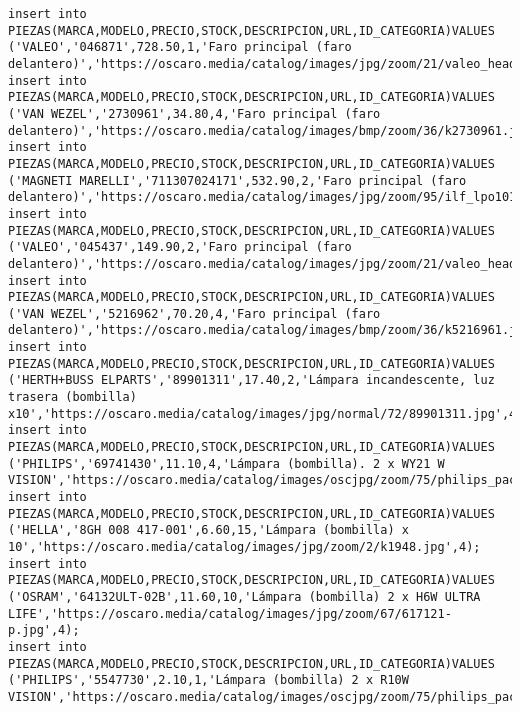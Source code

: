\begin{lstlisting}[caption=Script .sql para crear la BD (BBDD)]
insert into PIEZAS(MARCA,MODELO,PRECIO,STOCK,DESCRIPCION,URL,ID_CATEGORIA)VALUES ('VALEO','046871',728.50,1,'Faro principal (faro delantero)','https://oscaro.media/catalog/images/jpg/zoom/21/valeo_headlamp_046871_01.jpg',4);
insert into PIEZAS(MARCA,MODELO,PRECIO,STOCK,DESCRIPCION,URL,ID_CATEGORIA)VALUES ('VAN WEZEL','2730961',34.80,4,'Faro principal (faro delantero)','https://oscaro.media/catalog/images/bmp/zoom/36/k2730961.jpg',4);
insert into PIEZAS(MARCA,MODELO,PRECIO,STOCK,DESCRIPCION,URL,ID_CATEGORIA)VALUES ('MAGNETI MARELLI','711307024171',532.90,2,'Faro principal (faro delantero)','https://oscaro.media/catalog/images/jpg/zoom/95/ilf_lpo101_wr.jpg',4);
insert into PIEZAS(MARCA,MODELO,PRECIO,STOCK,DESCRIPCION,URL,ID_CATEGORIA)VALUES ('VALEO','045437',149.90,2,'Faro principal (faro delantero)','https://oscaro.media/catalog/images/jpg/zoom/21/valeo_headlamp_045437_01.jpg',4);
insert into PIEZAS(MARCA,MODELO,PRECIO,STOCK,DESCRIPCION,URL,ID_CATEGORIA)VALUES ('VAN WEZEL','5216962',70.20,4,'Faro principal (faro delantero)','https://oscaro.media/catalog/images/bmp/zoom/36/k5216961.jpg',4);
insert into PIEZAS(MARCA,MODELO,PRECIO,STOCK,DESCRIPCION,URL,ID_CATEGORIA)VALUES ('HERTH+BUSS ELPARTS','89901311',17.40,2,'Lámpara incandescente, luz trasera (bombilla) x10','https://oscaro.media/catalog/images/jpg/normal/72/89901311.jpg',4);
insert into PIEZAS(MARCA,MODELO,PRECIO,STOCK,DESCRIPCION,URL,ID_CATEGORIA)VALUES ('PHILIPS','69741430',11.10,4,'Lámpara (bombilla). 2 x WY21 W VISION','https://oscaro.media/catalog/images/oscjpg/zoom/75/philips_pack_pr_wy21w_69741430_12071b2_s_emea_16.jpg',4);
insert into PIEZAS(MARCA,MODELO,PRECIO,STOCK,DESCRIPCION,URL,ID_CATEGORIA)VALUES ('HELLA','8GH 008 417-001',6.60,15,'Lámpara (bombilla) x 10','https://oscaro.media/catalog/images/jpg/zoom/2/k1948.jpg',4);
insert into PIEZAS(MARCA,MODELO,PRECIO,STOCK,DESCRIPCION,URL,ID_CATEGORIA)VALUES ('OSRAM','64132ULT-02B',11.60,10,'Lámpara (bombilla) 2 x H6W ULTRA LIFE','https://oscaro.media/catalog/images/jpg/zoom/67/617121-p.jpg',4);
insert into PIEZAS(MARCA,MODELO,PRECIO,STOCK,DESCRIPCION,URL,ID_CATEGORIA)VALUES ('PHILIPS','5547730',2.10,1,'Lámpara (bombilla) 2 x R10W VISION','https://oscaro.media/catalog/images/oscjpg/zoom/75/philips_pack_pr_r10w_05547730_12814b2_s_emea_16.jpg',4);


\end{lstlisting}

